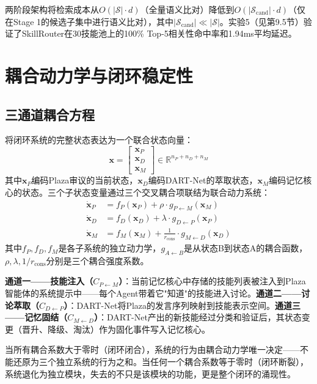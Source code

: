 \documentclass[12pt,a4paper]{ctexart}
\begin{document}
两阶段架构将检索成本从$O(|\mathcal{S}| \cdot d)$（全量语义比对）降低到$O(|\mathcal{S}_{\text{cand}}| \cdot d)$（仅在Stage 1的候选子集中进行语义比对），其中$|\mathcal{S}_{\text{cand}}| \ll |\mathcal{S}|$。实验5（见第9.5节）验证了SkillRouter在30技能池上的100\% Top-5相关性命中率和1.94ms平均延迟。

\section{耦合动力学与闭环稳定性}

\subsection{三通道耦合方程}

将闭环系统的完整状态表达为一个联合状态向量：
\begin{equation}
\mathbf{x} = \begin{bmatrix}
\mathbf{x}_P \\ \mathbf{x}_D \\ \mathbf{x}_M
\end{bmatrix} \in \mathbb{R}^{n_P + n_D + n_M}
\label{eq:unified_state}
\end{equation}
其中$\mathbf{x}_P$编码Plaza审议的当前状态，$\mathbf{x}_D$编码DART-Net的萃取状态，$\mathbf{x}_M$编码记忆核心的状态。三个子状态变量通过三个交叉耦合项联结为联合动力系统：
\begin{align}
\dot{\mathbf{x}}_P &= f_P(\mathbf{x}_P) + \rho \cdot g_{P \leftarrow M}(\mathbf{x}_M) \label{eq:dot_P} \\
\dot{\mathbf{x}}_D &= f_D(\mathbf{x}_D) + \lambda \cdot g_{D \leftarrow P}(\mathbf{x}_P) \label{eq:dot_D} \\
\dot{\mathbf{x}}_M &= f_M(\mathbf{x}_M) + \frac{1}{r_{\text{cons}}} \cdot g_{M \leftarrow D}(\mathbf{x}_D) \label{eq:dot_M}
\end{align}
其中$f_P, f_D, f_M$是各子系统的独立动力学，$g_{A \leftarrow B}$是从状态B到状态A的耦合函数，$\rho, \lambda, 1/r_{\text{cons}}$分别是三个耦合强度系数。

\textbf{通道一——技能注入（$C_{P \leftarrow M}$）}：当前记忆核心中存储的技能列表被注入到Plaza智能体的系统提示中——每个Agent带着它"知道"的技能进入讨论。\textbf{通道二——讨论萃取（$C_{D \leftarrow P}$）}：DART-Net将Plaza的发言序列映射到技能表示空间。\textbf{通道三——记忆固结（$C_{M \leftarrow D}$）}：DART-Net产出的新技能经过分类和验证后，其状态变更（晋升、降级、淘汰）作为固化事件写入记忆核心。

当所有耦合系数大于零时（闭环闭合），系统的行为由耦合动力学唯一决定——不能还原为三个独立系统的行为之和。当任何一个耦合系数等于零时（闭环断裂），系统退化为独立模块，失去的不只是该模块的功能，更是整个闭环的涌现性。
\end{document}
